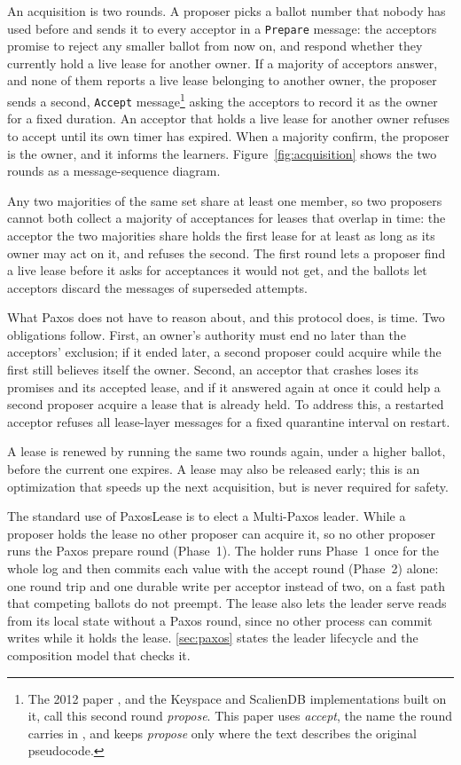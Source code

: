 \documentclass[final,5p,times,twocolumn,number]{elsarticle}
\newcommand{\code}[1]{\texttt{#1}}
\begin{document}
An acquisition is two rounds.  A proposer picks a ballot number that nobody has used before and sends it to every acceptor in a \code{Prepare} message: the acceptors promise to reject any smaller ballot from now on, and respond whether they currently hold a live lease for another owner.  If a majority of acceptors answer, and none of them reports a live lease belonging to another owner, the proposer sends a second, \code{Accept} message\footnote{The 2012 paper \cite{ref1}, and the Keyspace \cite{ref14} and ScalienDB \cite{ref15} implementations built on it, call this second round \emph{propose}.  This paper uses \emph{accept}, the name the round carries in \cite{ref2}, and keeps \emph{propose} only where the text describes the original pseudocode.} asking the acceptors to record it as the owner for a fixed duration.  An acceptor that holds a live lease for another owner refuses to accept until its own timer has expired.  When a majority confirm, the proposer is the owner, and it informs the learners.  Figure~\ref*{fig:acquisition} shows the two rounds as a message-sequence diagram.

Any two majorities of the same set share at least one member, so two proposers cannot both collect a majority of acceptances for leases that overlap in time: the acceptor the two majorities share holds the first lease for at least as long as its owner may act on it, and refuses the second.  The first round lets a proposer find a live lease before it asks for acceptances it would not get, and the ballots let acceptors discard the messages of superseded attempts.

What Paxos does not have to reason about, and this protocol does, is time.  Two obligations follow.  First, an owner's authority must end no later than the acceptors' exclusion; if it ended later, a second proposer could acquire while the first still believes itself the owner.  Second, an acceptor that crashes loses its promises and its accepted lease, and if it answered again at once it could help a second proposer acquire a lease that is already held.  To address this, a restarted acceptor refuses all lease-layer messages for a fixed quarantine interval on restart.

A lease is renewed by running the same two rounds again, under a higher ballot, before the current one expires.  A lease may also be released early; this is an optimization that speeds up the next acquisition, but is never required for safety.

The standard use of PaxosLease is to elect a Multi-Paxos leader.  While a proposer holds the lease no other proposer can acquire it, so no other proposer runs the Paxos prepare round (Phase~1).  The holder runs Phase~1 once for the whole log and then commits each value with the accept round (Phase~2) alone: one round trip and one durable write per acceptor instead of two, on a fast path that competing ballots do not preempt.  The lease also lets the leader serve reads from its local state without a Paxos round, since no other process can commit writes while it holds the lease.  \ref{sec:paxos} states the leader lifecycle and the composition model that checks it.
\end{document}
